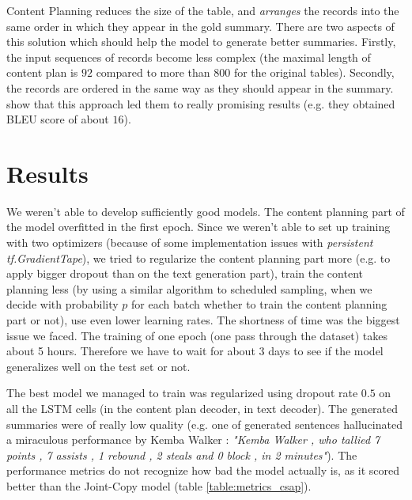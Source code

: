 Content Planning reduces the size of the table, and \emph{arranges} the records into the same order in which they appear in the gold summary. There are two aspects of this solution which should help the model to generate better summaries. Firstly, the input sequences of records become less complex (the maximal length of content plan is $92$ compared to more than $800$ for the original tables). Secondly, the records are ordered in the same way as they should appear in the summary. \citep{puduppully2019datatotext} show that this approach led them to really promising results (e.g. they obtained BLEU score of about $16$).

\section{Results}

We weren't able to develop sufficiently good models. The content planning part of the model overfitted in the first epoch. Since we weren't able to set up training with two optimizers (because of some implementation issues with \emph{persistent tf.GradientTape}), we tried to regularize the content planning part more (e.g. to apply bigger dropout than on the text generation part), train the content planning less (by using a similar algorithm to scheduled sampling, when we decide with probability $p$ for each batch whether to train the content planning part or not), use even lower learning rates. The shortness of time was the biggest issue we faced. The training of one epoch (one pass through the dataset) takes about 5 hours. Therefore we have to wait for about 3 days to see if the model generalizes well on the test set or not.

The best model we managed to train was regularized using dropout rate $0.5$ on all the LSTM cells (in the content plan decoder, in text decoder). The generated summaries were of really low quality (e.g. one of generated sentences hallucinated a miraculous performance by Kemba Walker :  \emph{"Kemba Walker , who tallied 7 points , 7 assists , 1 rebound , 2 steals and 0 block , in 2 minutes"}). The performance metrics do not recognize how bad the model actually is, as it scored better than the Joint-Copy model (table \ref{table:metrics_csap}).

